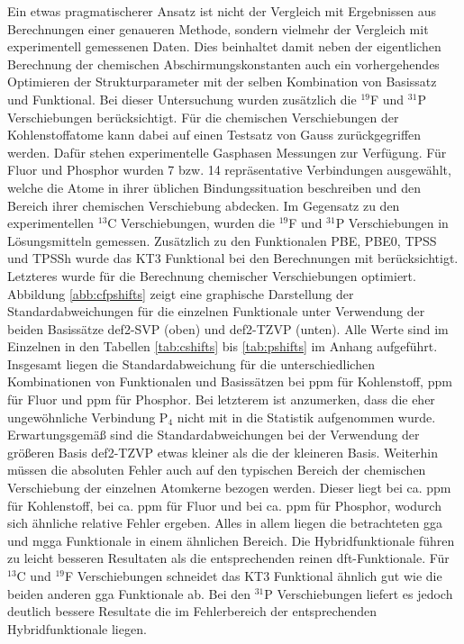 \bigskip
Ein etwas pragmatischerer Ansatz ist nicht der Vergleich mit Ergebnissen aus Berechnungen einer genaueren Methode, sondern vielmehr der Vergleich mit experimentell gemessenen Daten. Dies beinhaltet damit neben der eigentlichen Berechnung der chemischen Abschirmungskonstanten auch ein vorhergehendes Optimieren der Strukturparameter mit der selben Kombination von Basissatz und Funktional. Bei dieser Untersuchung wurden zusätzlich die $^{19}$F und $^{31}$P Verschiebungen berücksichtigt. Für die chemischen Verschiebungen der Kohlenstoffatome kann dabei auf einen Testsatz von Gauss\supercite{gauss1993effects} zurückgegriffen werden. Dafür stehen experimentelle Gasphasen Messungen zur Verfügung.\supercite{jameson1987gas} Für Fluor und Phosphor wurden 7 bzw. 14 repräsentative Verbindungen ausgewählt, welche die Atome in ihrer üblichen Bindungssituation beschreiben und den Bereich ihrer chemischen Verschiebung abdecken. Im Gegensatz zu den experimentellen $^{13}$C Verschiebungen, wurden die $^{19}$F und $^{31}$P Verschiebungen in Lösungsmitteln gemessen. Zusätzlich zu den Funktionalen PBE, PBE0, TPSS und TPSSh wurde das KT3\supercite{keal2004semiempirical} Funktional bei den Berechnungen mit berücksichtigt. Letzteres wurde für die Berechnung chemischer Verschiebungen optimiert. Abbildung \ref{abb:cfpshifts} zeigt eine graphische Darstellung der Standardabweichungen für die einzelnen Funktionale unter Verwendung der beiden Basissätze def2-SVP (oben) und def2-TZVP (unten). Alle Werte sind im Einzelnen in den Tabellen \ref{tab:cshifts} bis \ref{tab:pshifts} im Anhang aufgeführt. Insgesamt liegen die Standardabweichung für die unterschiedlichen Kombinationen von Funktionalen und Basissätzen bei \unit[3-8]{ppm} für Kohlenstoff, \unit[5-20]{ppm} für Fluor und \unit[17-34]{ppm} für Phosphor. Bei letzterem ist anzumerken, dass die eher ungewöhnliche Verbindung P$_4$ nicht mit in die Statistik aufgenommen wurde. Erwartungsgemäß sind die Standardabweichungen bei der Verwendung der größeren Basis def2-TZVP etwas kleiner als die der kleineren Basis. Weiterhin müssen die absoluten Fehler auch auf den typischen Bereich der chemischen Verschiebung der einzelnen Atomkerne bezogen werden. Dieser liegt bei ca. \unit[200]{ppm} für Kohlenstoff, bei ca. \unit[300]{ppm} für Fluor und bei ca. \unit[500]{ppm} für Phosphor, wodurch sich ähnliche relative Fehler ergeben. Alles in allem liegen die betrachteten \ac{gga} und \ac{mgga} Funktionale in einem ähnlichen Bereich. Die Hybridfunktionale führen zu leicht besseren Resultaten als die entsprechenden reinen \ac{dft}-Funktionale. Für $^{13}$C und $^{19}$F Verschiebungen schneidet das KT3 Funktional ähnlich gut wie die beiden anderen \ac{gga} Funktionale ab. Bei den $^{31}$P Verschiebungen liefert es jedoch deutlich bessere Resultate die im Fehlerbereich der entsprechenden Hybridfunktionale liegen. 

